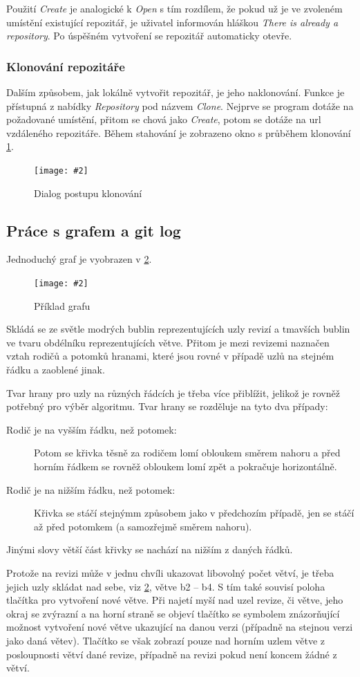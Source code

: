 \documentclass[
  biblatex,
  glossaries,
  index
]{kidiplom}
\newcommand{\pic}[4]{
\begin{figure}[h]
\centering
\texttt{[image: \#2]}
\caption{#3}
\label{fig:#4}
\end{figure}}
\begin{document}
Použití {\it Create} je analogické k {\it Open} s tím rozdílem, že pokud už je ve zvoleném umístění existující repozitář, je uživatel informován hláškou {\it There is already a repository}. Po úspěšném vytvoření se repozitář automaticky otevře.

\subsubsection{Klonování repozitáře}
Dalším způsobem, jak lokálně vytvořit repozitář, je jeho naklonování. Funkce je přístupná z nabídky {\it Repository} pod názvem {\it Clone}. Nejprve se program dotáže na požadované umístění, přitom se chová jako {\it Create}, potom se dotáže na url vzdáleného repozitáře. Během stahování je zobrazeno okno s průběhem klonování \ref{fig:clone}.


\pic{10cm}{clonning.png}{Dialog postupu klonování}{clone}


\subsection{Práce s grafem a git log}
Jednoduchý graf je vyobrazen v \ref{fig:graph}.

\pic{10cm}{graph.png}{Příklad grafu}{graph}

Skládá se ze světle modrých bublin reprezentujících uzly revizí a tmavších bublin ve tvaru obdélníku reprezentujících větve. Přitom je mezi revizemi naznačen vztah rodičů a potomků hranami, které jsou rovné v případě uzlů na stejném řádku a zaoblené jinak.

Tvar hrany pro uzly na různých řádcích je třeba více přiblížit, jelikož je rovněž potřebný pro výběr algoritmu. Tvar hrany se rozděluje na tyto dva případy:
\begin{description}
\item[Rodič je na vyšším řádku, než potomek:]
Potom se křivka těsně za rodičem lomí obloukem směrem nahoru a před horním řádkem se rovněž obloukem lomí zpět a pokračuje horizontálně.
\item[Rodič je na nižším řádku, než potomek:]
Křivka se stáčí stejnýmm způsobem jako v předchozím případě, jen se stáčí až před potomkem (a samozřejmě směrem nahoru).
\end{description}
Jinými slovy větší část křivky se nachází na nižším z daných řádků.

Protože na revizi může v jednu chvíli ukazovat libovolný počet větví, je třeba jejich uzly skládat nad sebe, viz \ref{fig:graph}, větve b2 -- b4. S tím také souvisí poloha tlačítka pro vytvoření nové větve. Při najetí myší nad uzel revize, či větve, jeho okraj se zvýrazní a na horní straně se objeví tlačítko se symbolem \uv{+} znázorňující možnost vytvoření nové větve ukazující na danou verzi (případně na stejnou verzi jako daná větev). Tlačítko se však zobrazí pouze nad horním uzlem větve z posloupnosti větví dané revize, případně na revizi pokud není koncem žádné z větví.
\end{document}
